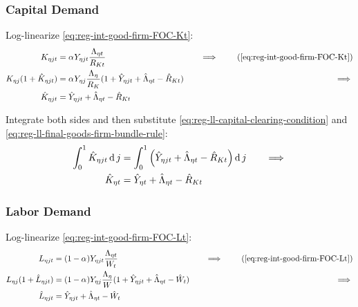 \documentclass[../thesis.tex]{subfiles}
\begin{document}

\subsubsection*{Capital Demand}

Log-linearize \ref{eq:reg-int-good-firm-FOC-Kt}:
\begin{alignat}{2}
	K_{\eta jt} &= {\alpha_{}} Y_{\eta jt} \frac{\Lambda_{\eta t}}{R_{Kt}} &\implies \tag{\ref{eq:reg-int-good-firm-FOC-Kt}} \\
	K_{\eta j} (1+ \hat{K}_{\eta jt}) &= {\alpha_{}} Y_{\eta j} \frac{\Lambda_{\eta}}{R_{K}} (1+ \hat{Y}_{\eta jt} + \hat{\Lambda}_{\eta t} - \hat{R}_{K t}) \quad &\implies \nonumber \\
	\hat{K}_{\eta jt} &= \hat{Y}_{\eta jt} + \hat{\Lambda}_{\eta t} - \hat{R}_{K t} \nonumber
\end{alignat}

Integrate both sides and then substitute \ref{eq:reg-ll-capital-clearing-condition} and \ref{eq:reg-ll-final-goods-firm-bundle-rule}:
\begin{alignat}{2}
	\int_{0}^{1} \hat{K}_{\eta jt} \operatorname{d} j &= \int_{0}^{1} \left( \hat{Y}_{\eta jt} + \hat{\Lambda}_{\eta t} - \hat{R}_{K t} \right) \operatorname{d} j \quad &\implies \nonumber \\
	\hat{K}_{\eta t} &= \hat{Y}_{\eta t} + \hat{\Lambda}_{\eta t} - \hat{R}_{K t} \label{eq:reg-ll-int-good-firm-FOC-Kt}
\end{alignat}


\subsubsection*{Labor Demand}

Log-linearize \ref{eq:reg-int-good-firm-FOC-Lt}:
\begin{alignat}{2}
	L_{\eta jt} &= (1-{\alpha_{}}) Y_{\eta jt} \frac{\Lambda_{\eta t}}{W_{t}} &\implies \tag{\ref{eq:reg-int-good-firm-FOC-Lt}} \\
	L_{\eta j} (1+ \hat{L}_{\eta jt}) &= (1-{\alpha_{}}) Y_{\eta j} \frac{\Lambda_{\eta}}{W} (1+ \hat{Y}_{\eta jt} +\hat{\Lambda}_{\eta t} -\hat{W}_{t}) \quad &\implies \nonumber \\
	\hat{L}_{\eta jt} &= \hat{Y}_{\eta jt} +\hat{\Lambda}_{\eta t} -\hat{W}_{t} \nonumber
\end{alignat}
\end{document}
